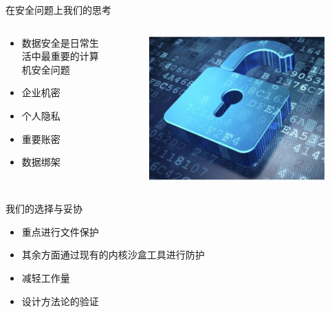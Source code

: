 \documentclass[UTF8,fontset=macnew,xcolor=table]{ctexbeamer}
\begin{document}
\begin{frame}{在安全问题上我们的思考}
    \begin{columns}
        \begin{column}{0.8\textwidth}
            \begin{itemize}
                \item 数据安全是日常生活中最重要的计算机安全问题
                \item 企业机密
                \item 个人隐私
                \item 重要账密
                \item 数据绑架
            \end{itemize}
        \end{column}

        \begin{column}{0.2\textwidth}
            \begin{figure}[H]
                \centering
                \includegraphics[width=\columnwidth]{pic4.png}
            \end{figure}
        \end{column}
    \end{columns}
\end{frame}

\begin{frame}{我们的选择与妥协}

    \begin{itemize}
        \item 重点进行文件保护
        \item 其余方面通过现有的内核沙盒工具进行防护\\
        
        \item 减轻工作量
        \item 设计方法论的验证
    \end{itemize}
    
\end{frame}
\end{document}
